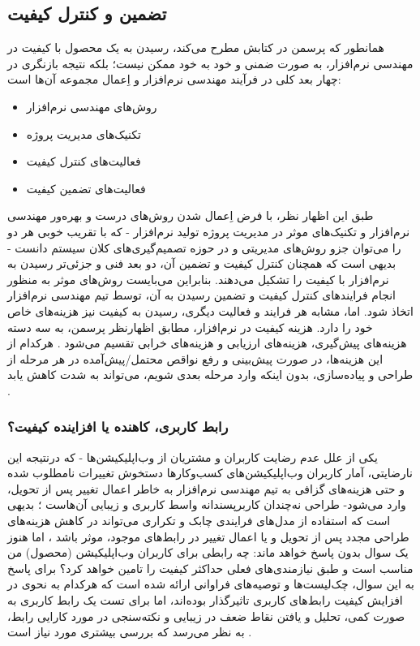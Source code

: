 \documentclass{article}
\theoremstyle{definition}
\begin{document}
	\subsection{تضمین و کنترل کیفیت}
همانطور که پرسمن در کتابش
\cite{pressman}
مطرح می‌کند، رسیدن به یک محصول با کیفیت در مهندسی نرم‌افزار، به صورت ضمنی و خود به خود ممکن نیست؛ بلکه نتیجه بازنگری در چهار بعد کلی در فرآیند مهندسی نرم‌افزار و اِعمال مجموعه آن‌ها است:
\begin{itemize}
	\item روش‌های مهندسی نرم‌افزار
	\item تکنیک‌های مدیریت پروژه
	\item فعالیت‌های کنترل کیفیت
	\item فعالیت‌های تضمین کیفیت
\end{itemize}
طبق این اظهار نظر، با فرض اِعمال شدن روش‌های درست و بهره‌ور مهندسی نرم‌افزار و تکنیک‌های موثر در مدیریت پروژه تولید نرم‌افزار - که با تقریب خوبی هر دو را می‌توان جزو روش‌های مدیریتی و در حوزه تصمیم‌گیری‌های کلان سیستم دانست - بدیهی است که همچنان کنترل کیفیت و تضمین آن، دو بعد فنی و جزئی‌تر رسیدن به نرم‌افزار با کیفیت را تشکیل می‌دهند. بنابراین می‌بایست روش‌های موثر به منظور انجام فرایند‌های کنترل کیفیت و تضمین رسیدن به آن، توسط تیم مهندسی نرم‌افزار اتخاذ شود.
اما، مشابه هر فرایند و فعالیت دیگری، رسیدن به کیفیت نیز هزینه‌های خاص خود را دارد. هزینه کیفیت در نرم‌افزار، مطابق اظهارنظر پرسمن، به سه دسته هزینه‌های پیش‌گیری، هزینه‌های ارزیابی و هزینه‌های خرابی تقسیم می‌شود
\cite{pressman}.
هرکدام از این هزینه‌ها، در صورت پیش‌بینی و رفع نواقص محتمل/پیش‌آمده در هر مرحله از طراحی و پیاده‌سازی، بدون اینکه وارد مرحله بعدی شویم، می‌تواند به شدت کاهش یابد 
\cite{pressman}.
\subsubsection{رابط کاربری، کاهنده یا افزاینده کیفیت؟}
یکی از علل عدم رضایت کاربران و مشتریان از وب‌اپلیکیشن‌ها - که درنتیجه این نارضایتی، آمار کاربران وب‌اپلیکیشن‌های کسب‌وکارها دستخوش تغییرات نامطلوب شده و حتی هزینه‌های گزافی به تیم مهندسی نرم‌افزار به خاطر اعمال تغییر پس از تحویل، وارد می‌شود- طراحی نه‌چندان کاربرپسندانه واسط کاربری و زیبایی آن‌هاست
\cite{assesing}؛
بدیهی است که استفاده از مدل‌های فرایندی چابک  و تکراری می‌تواند در کاهش هزینه‌های طراحی مجدد پس از تحویل و یا اعمال تغییر در رابط‌های موجود، موثر باشد 
\cite{pressman}،
اما هنوز یک سوال بدون پاسخ خواهد ماند: چه رابطی برای کاربران وب‌اپلیکیشن (محصول) من مناسب است و طبق نیازمندی‌های فعلی حداکثر کیفیت را تامین خواهد کرد؟ برای پاسخ به این سوال، چک‌لیست‌ها و توصیه‌های فراوانی
\cite{pressman, sommerville}
ارائه شده است که هرکدام به نحوی در افزایش کیفیت رابط‌های کاربری تاثیرگذار بوده‌اند، اما برای تست یک رابط کاربری به صورت کمی، تحلیل و یافتن نقاط ضعف در زیبایی و نکته‌سنجی در مورد کارایی رابط، به نظر می‌رسد که بررسی بیشتری مورد نیاز است
\cite{measuring}.
\end{document}
